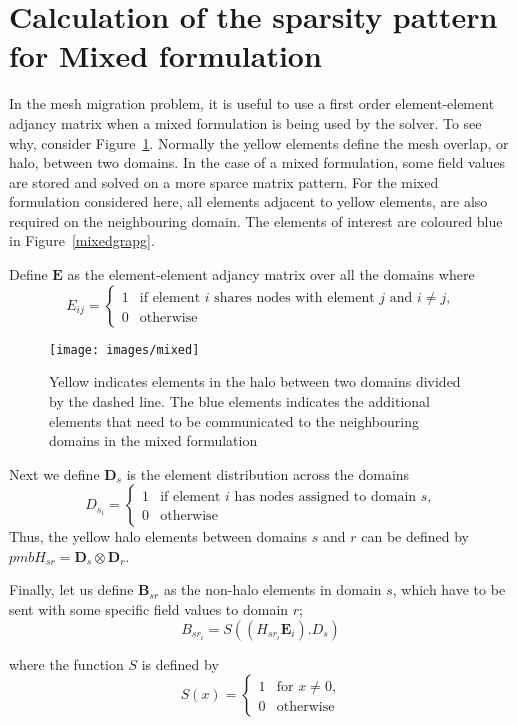 \documentclass[11pt]{article}
\begin{document}
\section{Calculation of the sparsity pattern for Mixed formulation}

In the mesh migration problem, it is useful to use a first order
element-element adjancy matrix when a mixed formulation is being used
by the solver. To see why, consider
Figure~\ref{fig:mixedgraph}. Normally the yellow elements define the
mesh overlap, or halo, between two domains. In the case of a mixed
formulation, some field values are stored and solved on a more sparce
matrix pattern. For the mixed formulation considered here, all
elements adjacent to yellow elements, are also required on the
neighbouring domain. The elements of interest are coloured blue in
Figure~\ref{mixedgrapg}.

Define $\pmb{E}$ as the element-element adjancy matrix over all the
domains where
\begin{displaymath}
E_{ij} = \left\{ \begin{array}{ll}
1 & \textrm{if element $i$ shares nodes with element $j$ and $i \ne j$,}\\
0 & \textrm{otherwise}
\end{array} \right.
\end{displaymath}

\begin{figure}[h]\label{fig:mixedgraph}
\centering
\texttt{[image: images/mixed]}
\caption{Yellow indicates elements in the halo between two domains
divided by the dashed line. The blue elements indicates the additional
elements that need to be communicated to the neighbouring domains in
the mixed formulation}
\end{figure}

Next we define $\pmb{D}_s$ is the element distribution across the domains
\begin{displaymath}
D_{s_i} = \left\{ \begin{array}{ll}
1 & \textrm{if element $i$ has nodes assigned to domain $s$,}\\
0 & \textrm{otherwise}
\end{array} \right.
\end{displaymath}
Thus, the yellow halo elements between domains $s$ and $r$ can be
defined by $pmb{H}_{sr} = \pmb{D}_s \otimes \pmb{D}_r$.

Finally, let us define $\pmb{B}_{sr}$ as the non-halo elements in
domain $s$, which have to be sent with some specific field values to
domain $r$;
\begin{equation}
B_{sr_i} = S( (H_{sr_i}\pmb{E}_i ).D_s )
\end{equation}

where the function $S$ is defined by
\begin{displaymath}
S(x) = \left\{ \begin{array}{ll}
1 & \textrm{for $x \ne 0$,}\\
0 & \textrm{otherwise}
\end{array} \right.
\end{displaymath}
\end{document}
